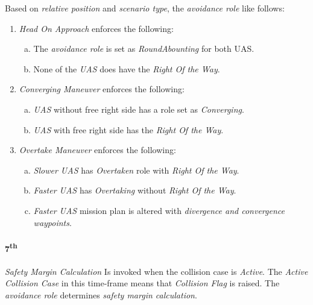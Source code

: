\noindent Based on \emph{relative position} and \emph{scenario type}, the \emph{avoidance role} like follows:
\begin{enumerate}
    \item \emph{Head On Approach} enforces the following:
    \begin{enumerate}[a.]
        \item The \emph{avoidance role} is set as \emph{RoundAbounting} for both UAS.
        
        \item None of the \emph{UAS} does have the \emph{Right Of the Way}.
    \end{enumerate}
    
    \item \emph{Converging Maneuver} enforces the following:
    \begin{enumerate}[a.]
        \item \emph{UAS} without free right side has a role set as \emph{Converging}.
        
        \item \emph{UAS} with free right side has the \emph{Right Of the Way}.
    \end{enumerate}
    
    \item \emph{Overtake Maneuver}  enforces the following:
    \begin{enumerate}[a.]
        \item \emph{Slower UAS} has \emph{Overtaken} role with \emph{Right Of the Way}.
        
        \item \emph{Faster UAS} has \emph{Overtaking} without 
        \emph{Right Of the Way}.
        
        \item \emph{Faster UAS} mission plan is altered with \emph{divergence and convergence waypoints}.
    \end{enumerate} 
\end{enumerate}

\paragraph{7\textsuperscript{th}} \emph{Safety Margin Calculation} Is invoked when the collision case is \emph{Active}. The \emph{Active Collision Case} in this time-frame means that \emph{Collision Flag} is raised. The \emph{avoidance role} determines \emph{safety margin calculation}.

